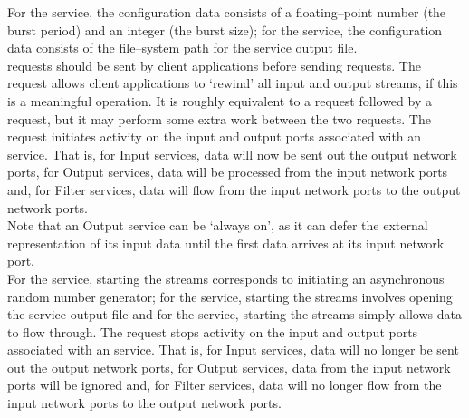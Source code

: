 For the  service, the configuration
data consists of a floating--point number (the burst period) and an integer (the burst
size); for the  service, the
configuration data consists of the file--system path for the service output file.\\

 requests should be sent by
client applications before sending
 requests.
The  request allows client
applications to `rewind' all input and output streams, if this is a meaningful operation.
It is roughly equivalent to a 
request followed by a  request,
but it may perform some extra work between the two requests.
The  request initiates activity
on the input and output ports associated with an  service.
That is, for Input services, data will now be sent out the output \yarp{} network ports,
for Output services, data will be processed from the input \yarp{} network ports and, for
Filter services, data will flow from the input \yarp{} network ports to the output \yarp{}
network ports.\\

Note that an Output service can be `always on', as it can defer the external
representation of its input data until the first data arrives at its input \yarp{}
network port.\\

For the  service, starting the
streams corresponds to initiating an asynchronous random number generator; for the
 service, starting the streams
involves opening the service output file and for the
 service, starting the streams
simply allows data to flow through.
The  request stops activity on
the input and output ports associated with an  service.
That is, for Input services, data will no longer be sent out the output \yarp{} network
ports, for Output services, data from the input \yarp{} network ports will be ignored and,
for Filter services, data will no longer flow from the input \yarp{} network ports to the
output \yarp{} network ports.\\

